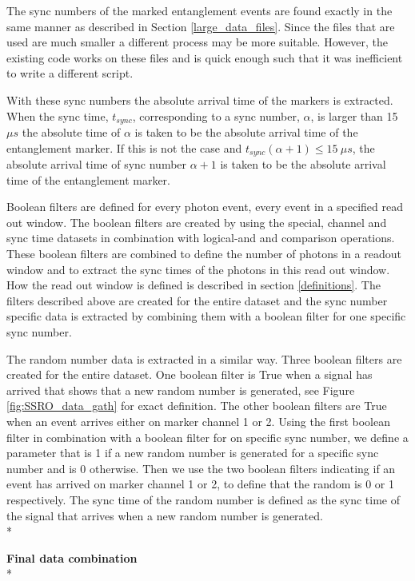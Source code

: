 The sync numbers of the marked entanglement events are found exactly in the same manner as described in Section \ref{large_data_files}. Since the files that are used are much smaller a different process may be more suitable. However, the existing code works on these files and is quick enough such that it was inefficient to write a different script. 

With these sync numbers the absolute arrival time of the markers is extracted. When the sync time, $t_{sync}$, corresponding to a sync number, $\alpha$, is larger than 15 $\mu s$ the absolute time of $\alpha$ is taken to be the absolute arrival time of the entanglement marker. If this is not the case and $t_{sync}\left( \alpha + 1 \right) \leq 15 \: \mu s $, the absolute arrival time of sync number $\alpha + 1$ is taken to be the absolute arrival time of the entanglement marker. 

Boolean filters are defined for every photon event, every event in a specified read out window. The boolean filters are created by using the special, channel and sync time datasets in combination with logical-and and comparison operations. These boolean filters are combined to define the number of photons in a readout window and to extract the sync times of the photons in this read out window. How the read out window is defined is described in section \ref{definitions}. The filters described above are created for the entire dataset and the sync number specific data is extracted by combining them with a boolean filter for one specific sync number. 

The random number data is extracted in a similar way. Three boolean filters are created for the entire dataset. One boolean filter is True when a signal has arrived that shows that a new random number is generated, see Figure \ref{fig:SSRO_data_gath} for exact definition. The other boolean filters are True when an event arrives either on marker channel 1 or 2. Using the first boolean filter in combination with a boolean filter for on specific sync number, we define a parameter that is 1 if a new random number is generated for a specific sync number and is 0 otherwise. Then we use the two boolean filters indicating if an event has arrived on marker channel 1 or 2, to define that the random is 0 or 1 respectively. The sync time of the random number is defined as the sync time of the signal that arrives when a new random number is generated. \\*

{\raggedright{\color{tudelft-cyan}\textbf{Final data combination}\color{black}\\*}}






